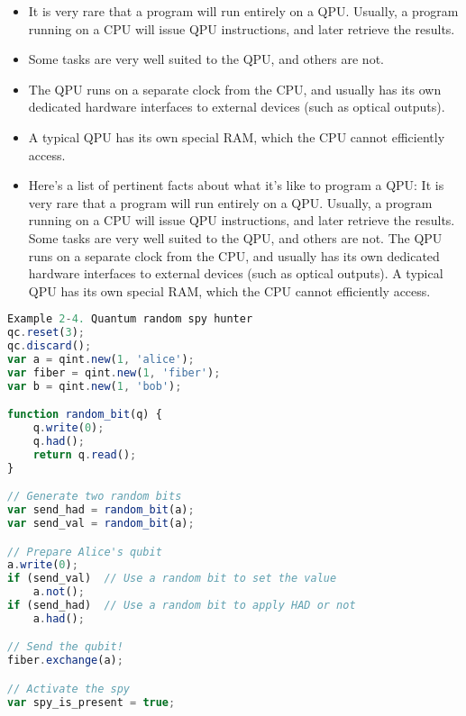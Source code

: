 

\begin{mdframed}[style=important, frametitle={QPU Versus GPU: Some Common Characteristics}]

\begin{itemize}
\item It is very rare that a program will run entirely on a QPU. Usually, a program running on a CPU will issue QPU instructions, and later retrieve the results.
\item Some tasks are very well suited to the QPU, and others are not.
\item The QPU runs on a separate clock from the CPU, and usually has its own dedicated hardware interfaces to external devices (such as optical outputs).
\item A typical QPU has its own special RAM, which the CPU cannot efficiently access.
\item Here's a list of pertinent facts about what it’s like to program a QPU:
It is very rare that a program will run entirely on a QPU. Usually, a program running on a CPU will issue QPU instructions, and later retrieve the results.
Some tasks are very well suited to the QPU, and others are not.
The QPU runs on a separate clock from the CPU, and usually has its own dedicated hardware interfaces to external devices (such as optical outputs).
A typical QPU has its own special RAM, which the CPU cannot efficiently access.
\end{itemize}
\end{mdframed}

\begin{lstlisting}[language=Javascript, caption=Javascript Program: Quantum random spy hunter]
Example 2-4. Quantum random spy hunter
qc.reset(3);
qc.discard();
var a = qint.new(1, 'alice');
var fiber = qint.new(1, 'fiber');
var b = qint.new(1, 'bob');

function random_bit(q) {
    q.write(0);
    q.had();
    return q.read();
}

// Generate two random bits
var send_had = random_bit(a);
var send_val = random_bit(a);

// Prepare Alice's qubit
a.write(0);
if (send_val)  // Use a random bit to set the value
    a.not();
if (send_had)  // Use a random bit to apply HAD or not
    a.had();

// Send the qubit!
fiber.exchange(a);

// Activate the spy
var spy_is_present = true;
\end{lstlisting}